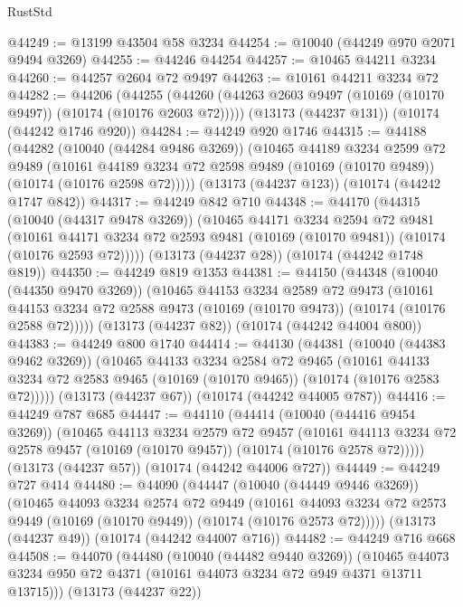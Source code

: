 \begin{lexlean}{RustStd}
\begin{coremodule}
@44249 := @13199 @43504 @58 @3234
@44254 := @10040 (@44249 @970 @2071 @9494 @3269)
@44255 := @44246 @44254
@44257 := @10465 @44211 @3234
@44260 := @44257 @2604 @72 @9497
@44263 := @10161 @44211 @3234 @72
@44282 := @44206
    (@44255 (@44260 (@44263 @2603 @9497 (@10169 (@10170 @9497)) (@10174 (@10176 @2603 @72)))))
    (@13173 (@44237 @131))
    (@10174 (@44242 @1746 @920))
@44284 := @44249 @920 @1746
@44315 := @44188
    (@44282
      (@10040 (@44284 @9486 @3269))
      (@10465
        @44189
        @3234
        @2599
        @72
        @9489
        (@10161 @44189 @3234 @72 @2598 @9489 (@10169 (@10170 @9489)) (@10174 (@10176 @2598 @72)))))
    (@13173 (@44237 @123))
    (@10174 (@44242 @1747 @842))
@44317 := @44249 @842 @710
@44348 := @44170
    (@44315
      (@10040 (@44317 @9478 @3269))
      (@10465
        @44171
        @3234
        @2594
        @72
        @9481
        (@10161 @44171 @3234 @72 @2593 @9481 (@10169 (@10170 @9481)) (@10174 (@10176 @2593 @72)))))
    (@13173 (@44237 @28))
    (@10174 (@44242 @1748 @819))
@44350 := @44249 @819 @1353
@44381 := @44150
    (@44348
      (@10040 (@44350 @9470 @3269))
      (@10465
        @44153
        @3234
        @2589
        @72
        @9473
        (@10161 @44153 @3234 @72 @2588 @9473 (@10169 (@10170 @9473)) (@10174 (@10176 @2588 @72)))))
    (@13173 (@44237 @82))
    (@10174 (@44242 @44004 @800))
@44383 := @44249 @800 @1740
@44414 := @44130
    (@44381
      (@10040 (@44383 @9462 @3269))
      (@10465
        @44133
        @3234
        @2584
        @72
        @9465
        (@10161 @44133 @3234 @72 @2583 @9465 (@10169 (@10170 @9465)) (@10174 (@10176 @2583 @72)))))
    (@13173 (@44237 @67))
    (@10174 (@44242 @44005 @787))
@44416 := @44249 @787 @685
@44447 := @44110
    (@44414
      (@10040 (@44416 @9454 @3269))
      (@10465
        @44113
        @3234
        @2579
        @72
        @9457
        (@10161 @44113 @3234 @72 @2578 @9457 (@10169 (@10170 @9457)) (@10174 (@10176 @2578 @72)))))
    (@13173 (@44237 @57))
    (@10174 (@44242 @44006 @727))
@44449 := @44249 @727 @414
@44480 := @44090
    (@44447
      (@10040 (@44449 @9446 @3269))
      (@10465
        @44093
        @3234
        @2574
        @72
        @9449
        (@10161 @44093 @3234 @72 @2573 @9449 (@10169 (@10170 @9449)) (@10174 (@10176 @2573 @72)))))
    (@13173 (@44237 @49))
    (@10174 (@44242 @44007 @716))
@44482 := @44249 @716 @668
@44508 := @44070
    (@44480
      (@10040 (@44482 @9440 @3269))
      (@10465 @44073 @3234 @950 @72 @4371 (@10161 @44073 @3234 @72 @949 @4371 @13711 @13715)))
    (@13173 (@44237 @22))

\end{coremodule}
\end{lexlean}
